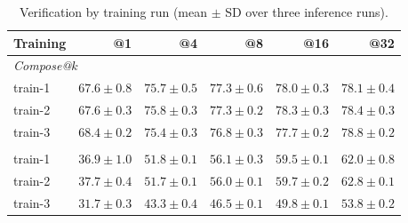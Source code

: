 \documentclass[10pt]{article}
\begin{document}
\begin{table}[H]
\centering
\begin{tabular}{lrrrrr}
\toprule
\rowcolor{headerbg}
Training & @1 & @4 & @8 & @16 & @32 \\
\midrule
\multicolumn{6}{l}{\textit{Compose@\(k\)}} \\
train-1 & \(67.6\pm0.8\) & \(75.7\pm0.5\) & \(77.3\pm0.6\) & \(78.0\pm0.3\) & \(78.1\pm0.4\) \\
train-2 & \(67.6\pm0.3\) & \(75.8\pm0.3\) & \(77.3\pm0.2\) & \(78.3\pm0.3\) & \(78.4\pm0.3\) \\
train-3 & \(68.4\pm0.2\) & \(75.4\pm0.3\) & \(76.8\pm0.3\) & \(77.7\pm0.2\) & \(78.8\pm0.2\) \\
\addlinespace
\multicolumn{6}{l}{\textit{Pass@\(k\)}} \\
train-1 & \(36.9\pm1.0\) & \(51.8\pm0.1\) & \(56.1\pm0.3\) & \(59.5\pm0.1\) & \(62.0\pm0.8\) \\
train-2 & \(37.7\pm0.4\) & \(51.7\pm0.1\) & \(56.0\pm0.1\) & \(59.7\pm0.2\) & \(62.8\pm0.1\) \\
train-3 & \(31.7\pm0.3\) & \(43.3\pm0.4\) & \(46.5\pm0.1\) & \(49.8\pm0.1\) & \(53.8\pm0.2\) \\
\bottomrule
\end{tabular}
\caption{Verification by training run (mean \(\pm\) SD over three inference runs).}
\label{tab:repeat-summary}
\end{table}
\end{document}
